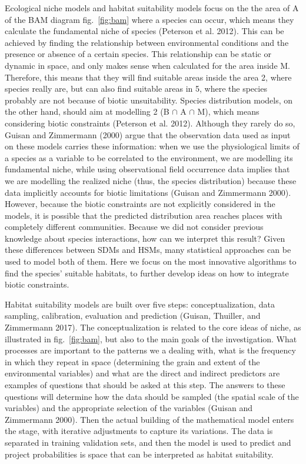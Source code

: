 \documentclass[12pt]{article}
\begin{document}
Ecological niche models and habitat suitability models focus on the the
area of A of the BAM diagram fig.~\ref{fig:bam} where a species can
occur, which means they calculate the fundamental niche of species
(Peterson et al. 2012). This can be achieved by finding the relationship
between environmental conditions and the presence or absence of a
certain species. This relationship can be static or dynamic in space,
and only makes sense when calculated for the area inside M. Therefore,
this means that they will find suitable areas inside the area 2, where
species really are, but can also find suitable areas in 5, where the
species probably are not because of biotic unsuitability. Species
distribution models, on the other hand, should aim at modelling 2 (B
\(\cap\) A \(\cap\) M), which means considering biotic constraints
(Peterson et al. 2012). Although they rarely do so, Guisan and
Zimmermann (2000) argue that the observation data used as input on these
models carries these information: when we use the physiological limits
of a species as a variable to be correlated to the environment, we are
modelling its fundamental niche, while using observational field
occurrence data implies that we are modelling the realized niche (thus,
the species distribution) because these data implicitly accounts for
biotic limitations (Guisan and Zimmermann 2000). However, because the
biotic constraints are not explicitly considered in the models, it is
possible that the predicted distribution area reaches places with
completely different communities. Because we did not consider previous
knowledge about species interactions, how can we interpret this result?
Given these differences between SDMs and HSMs, many statistical
approaches can be used to model both of them. Here we focus on the most
innovative algorithms to find the species' suitable habitats, to further
develop ideas on how to integrate biotic constraints.

Habitat suitability models are built over five steps: conceptualization,
data sampling, calibration, evaluation and prediction (Guisan, Thuiller,
and Zimmermann 2017). The conceptualization is related to the core ideas
of niche, as illustrated in fig.~\ref{fig:bam}, but also to the main
goals of the investigation. What processes are important to the patterns
we a dealing with, what is the frequency in which they repeat in space
(determining the grain and extent of the environmental variables) and
what are the direct and indirect predictors are examples of questions
that should be asked at this step. The answers to these questions will
determine how the data should be sampled (the spatial scale of the
variables) and the appropriate selection of the variables (Guisan and
Zimmermann 2000). Then the actual building of the mathematical model
enters the stage, with iterative adjustments to capture its variations.
The data is separated in training validation sets, and then the model is
used to predict and project probabilities is space that can be
interpreted as habitat suitability.
\end{document}
